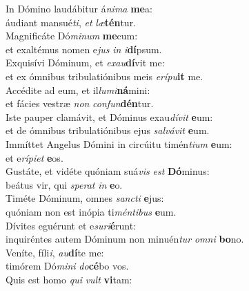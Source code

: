 \evenverse In Dómino laudábitur á\textit{ni}\textit{ma} \textbf{me}a:~\*\\
\evenverse áudiant mansué\textit{ti}, \textit{et} \textit{læ}\textbf{tén}tur.\\
\oddverse Magnificáte Dó\textit{mi}\textit{num} \textbf{me}cum:~\*\\
\oddverse et exaltémus nomen e\textit{jus} \textit{in} \textit{i}\textbf{dí}psum.\\
\evenverse Exquisívi Dóminum, et \textit{e}\textit{xau}\textbf{dí}vit me:~\*\\
\evenverse et ex ómnibus tribulatiónibus meis \textit{e}\textit{rí}\textit{pu}\textbf{it} me.\\
\oddverse Accédite ad eum, et il\textit{lu}\textit{mi}\textbf{ná}mini:~\*\\
\oddverse et fácies vestræ \textit{non} \textit{con}\textit{fun}\textbf{dén}tur.\\
\evenverse Iste pauper clamávit, et Dóminus exau\textit{dí}\textit{vit} \textbf{e}um:~\*\\
\evenverse et de ómnibus tribulatiónibus ejus \textit{sal}\textit{vá}\textit{vit} \textbf{e}um.\\
\oddverse Immíttet Angelus Dómini in circúitu timén\textit{ti}\textit{um} \textbf{e}um:~\*\\
\oddverse et e\textit{rí}\textit{pi}\textit{et} \textbf{e}os.\\
\evenverse Gustáte, et vidéte quóniam suá\textit{vis} \textit{est} \textbf{Dó}minus:~\*\\
\evenverse beátus vir, qui \textit{spe}\textit{rat} \textit{in} \textbf{e}o.\\
\oddverse Timéte Dóminum, omnes \textit{san}\textit{cti} \textbf{e}jus:~\*\\
\oddverse quóniam non est inópia ti\textit{mén}\textit{ti}\textit{bus} \textbf{e}um.\\
\evenverse Dívites eguérunt et e\textit{su}\textit{ri}\textbf{é}runt:~\*\\
\evenverse inquiréntes autem Dóminum non minuén\textit{tur} \textit{om}\textit{ni} \textbf{bo}no.\\
\oddverse Veníte, fíli\textit{i}, \textit{au}\textbf{dí}te me:~\*\\
\oddverse timórem Dó\textit{mi}\textit{ni} \textit{do}\textbf{cé}bo vos.\\
\evenverse Quis est homo \textit{qui} \textit{vult} \textbf{vi}tam:~\*\\
